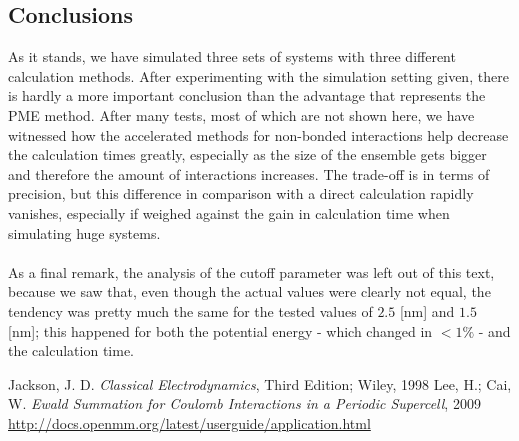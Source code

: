 \documentclass[a4paper, 12pt, notitlepage]{article}
\begin{document}
\subsection*{Conclusions}
As it stands, we have simulated three sets of systems with three different calculation methods. After experimenting with the simulation setting given, there is hardly a more important conclusion than the advantage that represents the PME method. After many tests, most of which are not shown here, we have witnessed how the accelerated methods for non-bonded interactions help decrease the calculation times greatly, especially as the size of the ensemble gets bigger and therefore the amount of interactions increases. The trade-off is in terms of precision, but this difference in comparison with a direct calculation rapidly vanishes, especially if weighed against the gain in calculation time when simulating huge systems.\\\\
As a final remark, the analysis of the cutoff parameter was left out of this text, because we saw that, even though the actual values were clearly not equal, the tendency was pretty much the same for the tested values of $2.5$ [nm] and $1.5$ [nm]; this happened for both the potential energy - which changed in $<1\%$ - and the calculation time.

\begin{thebibliography}{5}
	Jackson, J. D. \textit{Classical Electrodynamics}, Third Edition; Wiley, 1998
	Lee, H.; Cai, W. \textit{Ewald Summation for Coulomb Interactions in a Periodic Supercell}, 2009
	\href{http://docs.openmm.org/latest/userguide/application.html}{http://docs.openmm.org/latest/userguide/application.html}
\end{thebibliography}
\end{document}
